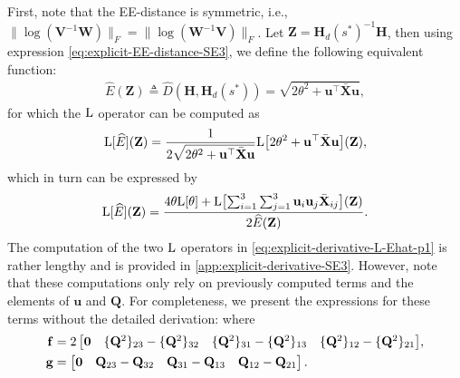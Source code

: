 First, note that the EE-distance is symmetric, i.e., $\bigl\|\log(\mathbf{V}^{-1}\mathbf{W})\bigr\|_F = \bigl\|\log(\mathbf{W}^{-1}\mathbf{V})\bigr\|_F$. Let $\mathbf{Z}=\mathbf{H}_d(s^*)^{-1}\mathbf{H}$, then using expression \eqref{eq:explicit-EE-distance-SE3}, we define the following equivalent function:
\begin{align}
    \widehat{E}(\mathbf{Z}) \triangleq \widehat{D}(\mathbf{H}, \mathbf{H}_d(s^*)) = \sqrt{2\theta^2 + \mathbf{u}^\top\bar{\mathbf{X}}\mathbf{u}},
    \label{eq:explicit-EE-dista-SE3-component-Ehat}
\end{align}
for which the $\operatorname{L}$ operator can be computed as
\begin{align}
    \operatorname{L}[\widehat{E}](\mathbf{Z}) = \frac{1}{2 \sqrt{2\theta^2 + \mathbf{u}^\top\bar{\mathbf{X}}\mathbf{u}}}\text{L}\bigl[2\theta^2 + \mathbf{u}^\top\bar{\mathbf{X}}\mathbf{u}\bigr](\mathbf{Z}),
\end{align}
which in turn can be expressed by 
\begin{align}
    \operatorname{L}[\widehat{E}](\mathbf{Z}) = \frac{4\theta\text{L}[\theta] + \operatorname{L}\bigl[\sum_{i=1}^{3}\sum_{j=1}^{3}\mathbf{u}_i\mathbf{u}_j\bar{\mathbf{X}}_{ij}\bigr](\mathbf{Z})}{2 \widehat{E}(\mathbf{Z})}. \label{eq:explicit-derivative-L-Ehat-p1}
\end{align}
The computation of the two $\operatorname{L}$ operators in \eqref{eq:explicit-derivative-L-Ehat-p1} is rather lengthy and is provided in \cref{app:explicit-derivative-SE3}. However, note that these computations only rely on previously computed terms and the elements of $\mathbf{u}$ and $\mathbf{Q}$. For completeness, we present the expressions for these terms without the detailed derivation:
where 
\begin{align}
    \mathbf{f} &= \textcolor{black}{2\begin{bmatrix}
        \mathbf{0}& \{\mathbf{Q}^2\}_{23}-\{\mathbf{Q}^2\}_{32} & \{\mathbf{Q}^2\}_{31} - \{\mathbf{Q}^2\}_{13} & \{\mathbf{Q}^2\}_{12}-\{\mathbf{Q}^2\}_{21}
    \end{bmatrix}},\label{eq:explicit-EE-dista-SE3-component-fvec}\\
    \mathbf{g} &= \begin{bmatrix}
        \mathbf{0}& \mathbf{Q}_{23}-\mathbf{Q}_{32} & \textcolor{black}{\mathbf{Q}_{31} - \mathbf{Q}_{13}} & \mathbf{Q}_{12}-\mathbf{Q}_{21}
    \end{bmatrix} \label{eq:explicit-EE-dista-SE3-component-gvec}.
\end{align}
